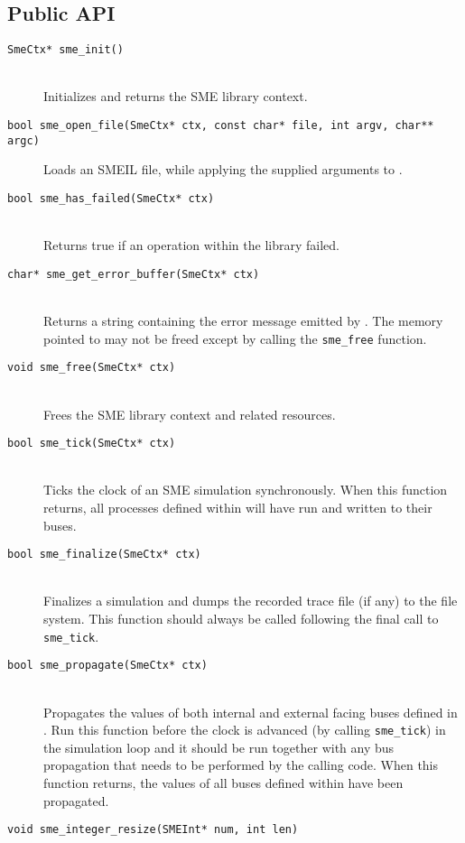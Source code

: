 \subsection{Public API}
\begin{description}
\item[\texttt{SmeCtx* sme\_init()}]\hfill\\
   Initializes and returns the SME library context.
 \item[\texttt{bool sme_open_file(SmeCtx* ctx, const char* file, int argv,
     char** argc)}]\hfill Loads an SMEIL file, while applying the supplied
   arguments to \libsme{}.
   \item[\texttt{bool sme_has_failed(SmeCtx* ctx)}]\hfill\\
     Returns true if an operation within the \libsme{} library failed.
 \item[\texttt{char* sme_get_error_buffer(SmeCtx* ctx)}]\hfill\\
   Returns a string containing the error message emitted by \libsme{}. The memory
   pointed to may not be freed except by calling the \texttt{sme_free} function.
 \item[\texttt{void sme_free(SmeCtx* ctx)}]\hfill\\
   Frees the SME library context and related resources.
 \item[\texttt{bool sme_tick(SmeCtx* ctx)}]\hfill\\
   Ticks the clock of an SME simulation synchronously. When this function
   returns, all processes defined within \libsme{} will have run and written to
   their buses.
 \item[\texttt{bool sme_finalize(SmeCtx* ctx)}]\hfill\\
   Finalizes a simulation and dumps the recorded trace file (if any) to the file
   system. This function should always be called following the final call to
   \texttt{sme_tick}.
 \item[\texttt{bool sme_propagate(SmeCtx* ctx)}]\hfill\\
   Propagates the values of both internal and external facing buses defined in
   \libsme{}. Run this function before the clock is advanced (by calling
   \texttt{sme_tick}) in the simulation loop and it should be run together with
   any bus propagation that needs to be performed by the calling code. When this
   function returns, the values of all buses defined within \libsme{} have been
   propagated.
 \item[\texttt{void sme_integer_resize(SMEInt* num, int len)}]\hfill\\

\end{description}
